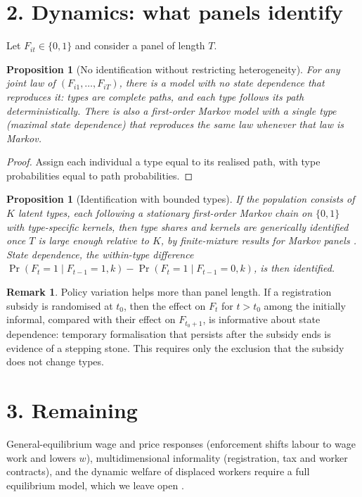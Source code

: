 \documentclass[11pt]{article}
\newtheorem{proposition}[theorem]{Proposition}
\theoremstyle{definition}
\newtheorem{remark}[theorem]{Remark}
\begin{document}
\section*{2. Dynamics: what panels identify}
Let $F_{it}\in\{0,1\}$ and consider a panel of length $T$.
\begin{proposition}[No identification without restricting heterogeneity]\label{prop:nonid}
For any joint law of $(F_{i1},\dots,F_{iT})$, there is a model with \emph{no} state dependence that reproduces it: types are
complete paths, and each type follows its path deterministically. There is also a first-order Markov model with a single type
(maximal state dependence) that reproduces the same law whenever that law is Markov.
\end{proposition}
\begin{proof}
Assign each individual a type equal to its realised path, with type probabilities equal to path probabilities.
\end{proof}
\begin{proposition}[Identification with bounded types]\label{prop:id}
If the population consists of $K$ latent types, each following a stationary first-order Markov chain on $\{0,1\}$ with
type-specific kernels, then type shares and kernels are generically identified once $T$ is large enough relative to $K$, by
finite-mixture results for Markov panels \cite{ks}. State dependence, the within-type difference
$\Pr(F_t=1\mid F_{t-1}=1,k)-\Pr(F_t=1\mid F_{t-1}=0,k)$, is then identified.
\end{proposition}
\begin{remark}
Policy variation helps more than panel length. If a registration subsidy is randomised at $t_0$, then the effect on $F_{t}$ for
$t>t_0$ among the initially informal, compared with their effect on $F_{t_0+1}$, is informative about state dependence:
temporary formalisation that persists after the subsidy ends is evidence of a stepping stone. This requires only the
exclusion that the subsidy does not change types.
\end{remark}

\section*{3. Remaining}
General-equilibrium wage and price responses (enforcement shifts labour to wage work and lowers $w$), multidimensional
informality (registration, tax and worker contracts), and the dynamic welfare of displaced workers require a full
equilibrium model, which we leave open \cite{voxdev}.
\end{document}
